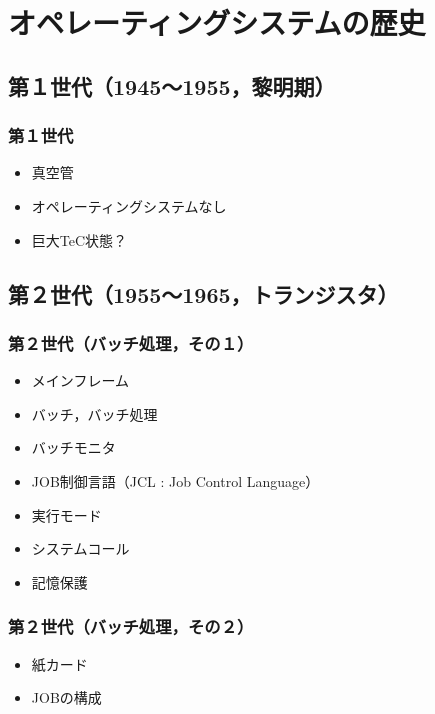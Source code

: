 \documentclass[unicode]{beamer}                   %
\begin{document}
\section{オペレーティングシステムの歴史}
\subsection{第１世代（1945〜1955，黎明期）}
\begin{frame}
  \frametitle{第１世代}
  \begin{itemize}
    \item 真空管
    \item オペレーティングシステムなし
    \item 巨大TeC状態？
  \end{itemize}
\end{frame}

\subsection{第２世代（1955〜1965，トランジスタ）}
\begin{frame}
  \frametitle{第２世代（バッチ処理，その１）}
  \begin{itemize}
    \item メインフレーム
    \item バッチ，バッチ処理
    \item バッチモニタ
    \item JOB制御言語（JCL :  Job Control Language）
    \item 実行モード
    \item システムコール
    \item 記憶保護
  \end{itemize}
\end{frame}

\begin{frame}
  \frametitle{第２世代（バッチ処理，その２）}
  \begin{itemize}
    \item 紙カード
    \item JOBの構成
  \end{itemize}
\end{frame}

\end{document}
